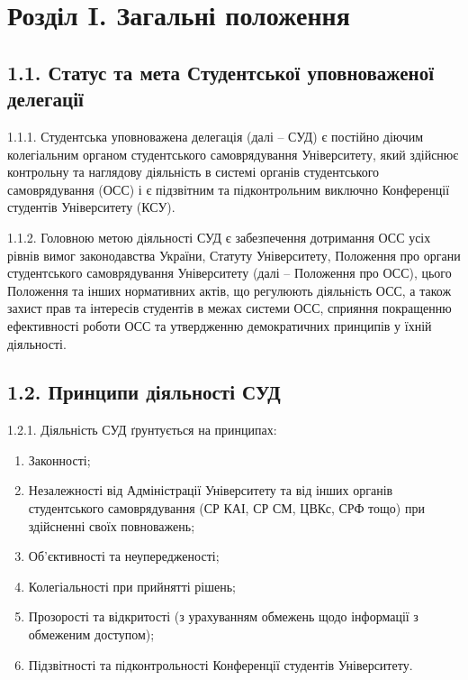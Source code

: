 \section*{Розділ I. Загальні положення}

\subsection*{1.1. Статус та мета Студентської уповноваженої делегації}
    1.1.1. Студентська уповноважена делегація (далі – СУД) є постійно діючим колегіальним органом студентського самоврядування Університету, який здійснює контрольну та наглядову діяльність в системі органів студентського самоврядування (ОСС) і є підзвітним та підконтрольним виключно Конференції студентів Університету (КСУ).

    1.1.2. Головною метою діяльності СУД є забезпечення дотримання ОСС усіх рівнів вимог законодавства України, Статуту Університету, Положення про органи студентського самоврядування Університету (далі – Положення про ОСС), цього Положення та інших нормативних актів, що регулюють діяльність ОСС, а також захист прав та інтересів студентів в межах системи ОСС, сприяння покращенню ефективності роботи ОСС та утвердженню демократичних принципів у їхній діяльності.

\subsection*{1.2. Принципи діяльності СУД}
    1.2.1. Діяльність СУД ґрунтується на принципах:

        \begin{enumerate}[label=\alph*)]
            \item Законності;
            \item Незалежності від Адміністрації Університету та від інших органів студентського самоврядування (СР КАІ, СР СМ, ЦВКс, СРФ тощо) при здійсненні своїх повноважень;
            \item Об'єктивності та неупередженості;
            \item Колегіальності при прийнятті рішень;
            \item Прозорості та відкритості (з урахуванням обмежень щодо інформації з обмеженим доступом);
            \item Підзвітності та підконтрольності Конференції студентів Університету.
        \end{enumerate}

